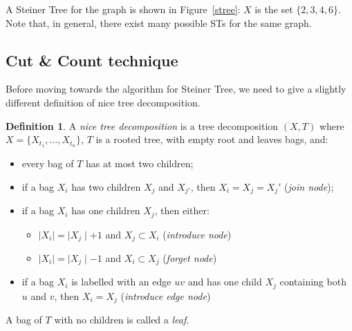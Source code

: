 \documentclass{article}
\theoremstyle{definition}
\newtheorem{definition}{Definition}[section]
\theoremstyle{lemma}
\theoremstyle{corollary}
\theoremstyle{theorem}
\begin{document}
A Steiner Tree for the graph is shown in Figure~\ref{stree}: $X$ is the set $\{2,3,4,6\}$. Note that, in general, there exist many possible STs for the same graph.

\subsection{Cut \& Count technique}
Before moving towards the algorithm for Steiner Tree, we need to give a slightly different definition of nice tree decomposition.
\theoremstyle{definition}
\begin{definition}
	A \emph{nice tree decomposition} is a tree decomposition $(X, T)$ where 
	$X = \{X_{t_1},...,X_{t_n}\}$, $T$ is a rooted tree, with empty root and leaves bags, and:
	\begin{itemize}
		\item every bag of $T$ has at most two children;
		\item if a bag $X_i$ has two children $X_j$ and $X_{j'}$, 
		then $X_i = X_j = X_j'$ (\emph{join node});
		\item if a bag $X_i$ has one children $X_j$, then either:
		\begin{itemize}
			\item $\mid X_i \mid = \mid X_j \mid + 1$ and $X_j \subset X_i$ 
			(\emph{introduce node})
			\item $\mid X_i \mid = \mid X_j \mid - 1$ and $X_i \subset X_j$ 
			(\emph{forget node})
		\end{itemize}
		\item if a bag $X_i$ is labelled with an edge $uv$ and has one child $X_j$ containing
		both $u$ and $v$, then $X_i = X_j$ (\emph{introduce edge node})
	\end{itemize}
	A bag of $T$ with no children is called a \emph{leaf}.
\end{definition}
\end{document}
